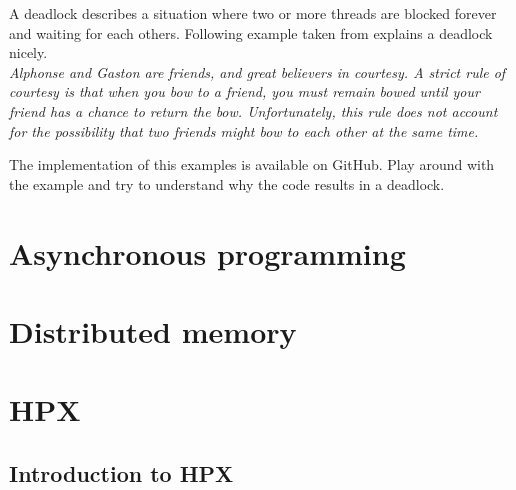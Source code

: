 \documentclass[11pt,fleqn]{book} %
\begin{document}
A deadlock describes a situation where two or more threads are blocked forever and waiting for each others. Following example taken from explains a deadlock nicely. \\

\textit{Alphonse and Gaston are friends, and great believers in courtesy. A strict rule of courtesy is that when you bow to a friend, you must remain bowed until your friend has a chance to return the bow. Unfortunately, this rule does not account for the possibility that two friends might bow to each other at the same time.}

\begin{exercise}
The implementation of this examples is available on GitHub. Play around with the example and try to understand why the code results in a deadlock. 
\end{exercise}

\chapter{Asynchronous programming}
\label{sec:async:coding}


\chapter{Distributed memory}




\chapter{HPX}
\label{sec:hpx}

\section{Introduction to HPX}
\end{document}
